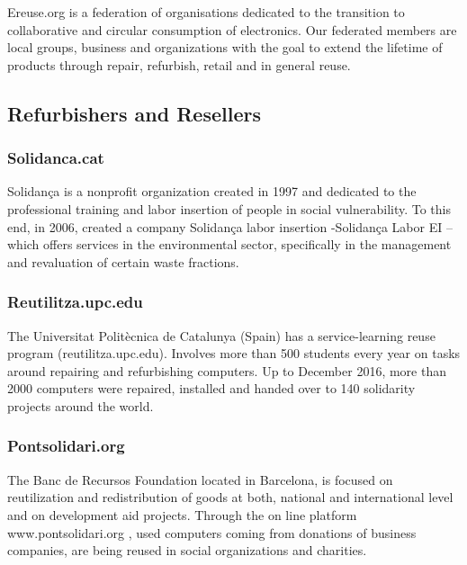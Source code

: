 \documentclass[
]{book}
\begin{document}
Ereuse.org is a federation of organisations dedicated to the transition to collaborative and circular consumption of electronics. Our federated members are local groups, business and organizations with the goal to extend the lifetime of products through repair, refurbish, retail and in general reuse.

\hypertarget{refurbishers-and-resellers}{%
\subsection{Refurbishers and Resellers}\label{refurbishers-and-resellers}}

\hypertarget{solidanca.cat}{%
\subsubsection{Solidanca.cat}\label{solidanca.cat}}

Solidança is a nonprofit organization created in 1997 and dedicated to the professional training and labor insertion of people in social vulnerability. To this end, in 2006, created a company Solidança labor insertion -Solidança Labor EI -- which offers services in the environmental sector, specifically in the management and revaluation of certain waste fractions.

\hypertarget{reutilitza.upc.edu}{%
\subsubsection{Reutilitza.upc.edu}\label{reutilitza.upc.edu}}

The Universitat Politècnica de Catalunya (Spain) has a service-learning reuse program (reutilitza.upc.edu). Involves more than 500 students every year on tasks around repairing and refurbishing computers. Up to December 2016, more than 2000 computers were repaired, installed and handed over to 140 solidarity projects around the world.

\hypertarget{pontsolidari.org}{%
\subsubsection{Pontsolidari.org}\label{pontsolidari.org}}

The Banc de Recursos Foundation located in Barcelona, is focused on reutilization and redistribution of goods at both, national and international level and on development aid projects. Through the on line platform www.pontsolidari.org , used computers coming from donations of business companies, are being reused in social organizations and charities.
\end{document}
